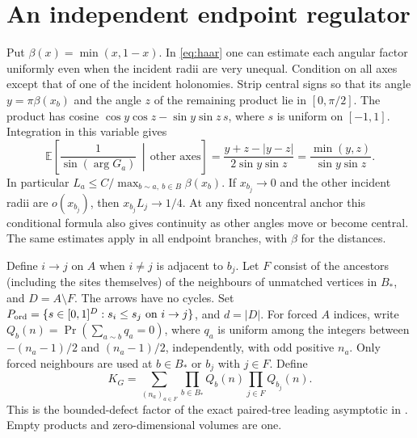 \section{An independent endpoint regulator}\label{sec:regulator}

Put \(\beta(x)=\min(x,1-x)\). In \eqref{eq:haar} one can estimate each angular factor uniformly even when the incident radii are very unequal. Condition on all axes except that of one of the incident holonomies. Strip central signs so that its angle \(y=\pi\beta(x_b)\) and the angle \(z\) of the remaining product lie in \([0,\pi/2]\). The product has cosine \(\cos y\cos z-\sin y\sin z\,s\), where \(s\) is uniform on \([-1,1]\). Integration in this variable gives
\begin{equation}\label{eq:shell}
 \mathbb E\!\left[\frac1{\sin(\arg G_a)}\,\middle|\,\text{other axes}\right]
 =\frac{y+z-|y-z|}{2\sin y\sin z}
 =\frac{\min(y,z)}{\sin y\sin z}.
\end{equation}
In particular \(L_a\le C/\max_{b\sim a,\ b\in B}\beta(x_b)\). If \(x_{b_j}\to0\) and the other incident radii are \(o(x_{b_j})\), then \(x_{b_j}L_j\to1/4\). At any fixed noncentral anchor this conditional formula also gives continuity as other angles move or become central. The same estimates apply in all endpoint branches, with \(\beta\) for the distances.

Define \(i\to j\) on \(A\) when \(i\ne j\) is adjacent to \(b_j\). Let \(F\) consist of the ancestors (including the sites themselves) of the neighbours of unmatched vertices in \(B_*\), and \(D=A\setminus F\). The arrows have no cycles. Set \(P_{\rm ord}=\{s\in[0,1]^D:s_i\le s_j\text{ on }i\to j\}\), and \(d=|D|\). For forced \(A\) indices, write \(Q_b(n)=\Pr(\sum_{a\sim b}q_a=0)\), where \(q_a\) is uniform among the integers between \(-(n_a-1)/2\) and \((n_a-1)/2\), independently, with odd positive \(n_a\). Only forced neighbours are used at \(b\in B_*\) or \(b_j\) with \(j\in F\). Define
\[
 K_G=\sum_{(n_a)_{a\in F}}\prod_{b\in B_*}Q_b(n)\prod_{j\in F}Q_{b_j}(n).
\]
This is the bounded-defect factor of the exact paired-tree leading asymptotic in \cite{P48}. Empty products and zero-dimensional volumes are one.

